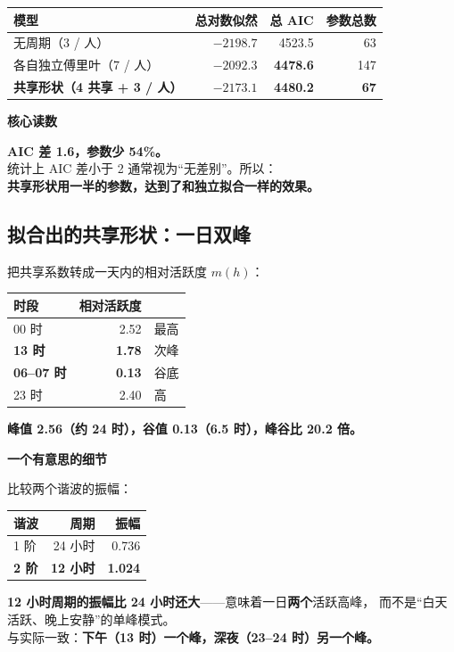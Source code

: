 \documentclass[UTF8,a4paper,11pt]{ctexart}
\newenvironment{explainbox}[1]
{\begin{center}\begin{minipage}{0.94\textwidth}\colorbox{boxbg}{\parbox{0.92\textwidth}{\textbf{#1}\par\vspace{2pt}}}}
{\end{minipage}\end{center}}
\begin{document}
\begin{center}
\begin{tabular}{p{5.0cm}rrr}
\toprule
\textbf{模型} & \textbf{总对数似然} & \textbf{总 AIC} & \textbf{参数总数} \\
\midrule
无周期（3 / 人） & $-2198.7$ & 4523.5 & 63 \\
各自独立傅里叶（7 / 人） & $-2092.3$ & \textbf{4478.6} & 147 \\
\textbf{共享形状（4 共享 + 3 / 人）} & $-2173.1$ & \textbf{4480.2} & \textbf{67} \\
\bottomrule
\end{tabular}
\end{center}

\begin{explainbox}{核心读数}
\textbf{AIC 差 1.6，参数少 54\%。}\\
统计上 AIC 差小于 2 通常视为“无差别”。所以：\\
\textbf{共享形状用一半的参数，达到了和独立拟合一样的效果。}
\end{explainbox}

\subsection{拟合出的共享形状：一日双峰}

把共享系数转成一天内的相对活跃度 $m(h)$：

\begin{center}
\begin{tabular}{lrl}
\toprule
\textbf{时段} & \textbf{相对活跃度} & \\
\midrule
00 时 & 2.52 & 最高 \\
\textbf{13 时} & \textbf{1.78} & 次峰 \\
\textbf{06--07 时} & \textbf{0.13} & 谷底 \\
23 时 & 2.40 & 高 \\
\bottomrule
\end{tabular}
\end{center}

\textbf{峰值 2.56（约 24 时），谷值 0.13（6.5 时），峰谷比 20.2 倍。}

\begin{explainbox}{一个有意思的细节}
比较两个谐波的振幅：
\begin{center}
\begin{tabular}{lrr}
\toprule
谐波 & 周期 & 振幅 \\
\midrule
1 阶 & 24 小时 & 0.736 \\
\textbf{2 阶} & \textbf{12 小时} & \textbf{1.024} \\
\bottomrule
\end{tabular}
\end{center}
\textbf{12 小时周期的振幅比 24 小时还大}——意味着一日\textbf{两个}活跃高峰，
而不是“白天活跃、晚上安静”的单峰模式。\\
与实际一致：\textbf{下午（13 时）一个峰，深夜（23--24 时）另一个峰。}
\end{explainbox}
\end{document}
